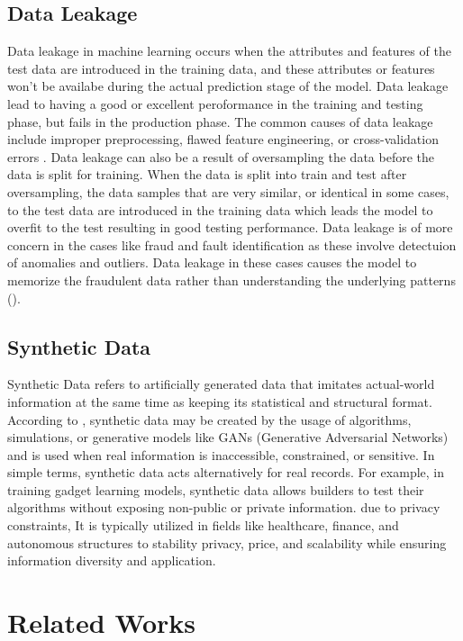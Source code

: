 \documentclass[twoside,11pt]{article}
\begin{document}
\subsection{Data Leakage}
Data leakage in machine learning occurs when the attributes and features of the test data are introduced in the training data, and these attributes or features won't be availabe during the actual prediction stage of the model. Data leakage lead to having a good or excellent peroformance in the training and testing phase, but fails in the production phase. The common causes of data leakage include improper preprocessing, flawed feature engineering, or cross-validation errors \cite{Kaufman2012}. Data leakage can also be a result of oversampling the data before the data is split for training. When the data is split into train and test after oversampling, the data samples that are very similar, or identical in some cases, to the test data are introduced in the training data which leads the model to overfit to the test resulting in good testing performance. Data leakage is of more concern in the cases like fraud and fault identification as these involve detectuion of anomalies and outliers. Data leakage in these cases causes the model to memorize the fraudulent data rather than understanding the underlying patterns (\citealp{baesensRobROSERobustApproach2021}).

\subsection{Synthetic Data}
Synthetic Data refers to artificially generated data that imitates actual-world information at the same time as keeping its statistical and structural format. According to \citealp{SyntheticPatki2016}, synthetic data may be created by the usage of algorithms, simulations, or generative models like GANs (Generative Adversarial Networks) and is used when real information is inaccessible, constrained, or sensitive.
In simple terms, synthetic data acts alternatively for real records. For example, in training gadget learning models, synthetic data allows builders to test their algorithms without exposing non-public or private information. due to privacy constraints, It is typically utilized in fields like healthcare, finance, and autonomous structures to stability privacy, price, and scalability while ensuring information diversity and application.

\section{Related Works}\label{sec:relatedwork}
\end{document}
